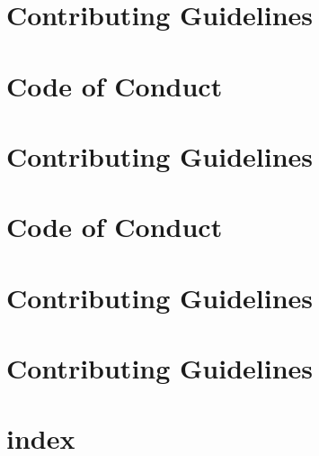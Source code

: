 \documentclass[twoside]{book}
\newcommand{\+}{\discretionary{\mbox{\scriptsize$\hookleftarrow$}}{}{}}
\begin{document}
\chapter{Contributing Guidelines}
\label{md_crt_aws_crt_cpp__c_o_n_t_r_i_b_u_t_i_n_g}

\chapter{Code of Conduct}
\label{md_crt_aws_crt_cpp_crt_aws_c_auth__c_o_d_e__o_f__c_o_n_d_u_c_t}

\chapter{Contributing Guidelines}
\label{md_crt_aws_crt_cpp_crt_aws_c_auth__c_o_n_t_r_i_b_u_t_i_n_g}

\chapter{Code of Conduct}
\label{md_crt_aws_crt_cpp_crt_aws_c_cal__c_o_d_e__o_f__c_o_n_d_u_c_t}

\chapter{Contributing Guidelines}
\label{md_crt_aws_crt_cpp_crt_aws_c_cal__c_o_n_t_r_i_b_u_t_i_n_g}

\chapter{Contributing Guidelines}
\label{md_crt_aws_crt_cpp_crt_aws_c_common__c_o_n_t_r_i_b_u_t_i_n_g}

\chapter{index}
\label{md_crt_aws_crt_cpp_crt_aws_c_common_verification_cbmc_litani_doc_index}

\end{document}
